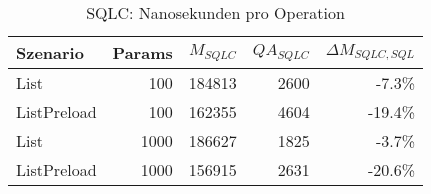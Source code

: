 
\begin{table}[ht]
\centering
\caption{SQLC: Nanosekunden pro Operation}
\begin{tabular}{lrrrr}
\toprule
Szenario & Params & ${M_{SQLC}}$ & ${QA_{SQLC}}$ & ${\Delta M_{SQLC,SQL}}$  \\
\midrule

	List & 100 & 184813 & 2600 & -7.3\% \\
	ListPreload & 100 & 162355 & 4604 & -19.4\% \\
	List & 1000 & 186627 & 1825 & -3.7\% \\
	ListPreload & 1000 & 156915 & 2631 & -20.6\% \\
\bottomrule
\end{tabular}
\label{tab:benchmark_sqlc_nsperop}
\end{table}
	